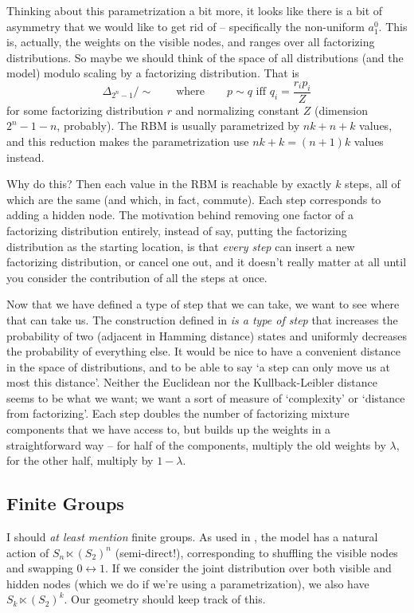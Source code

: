 \documentclass[12pt]{article}
\begin{document}
Thinking about this parametrization a bit more, it looks like there is a bit of
asymmetry that we would like to get rid of -- specifically the non-uniform
$a_1^0$.  This is, actually, the weights on the visible nodes, and ranges over
all factorizing distributions.  So maybe we should think of the space of
all distributions (and the model) modulo scaling by a factorizing distribution.
That is
\[
    \Delta_{2^n - 1} / \sim
    \qquad\text{where}\qquad
    p \sim q \text{ iff }
    q_i = \frac{r_i p_i}{Z}
\]
for some factorizing distribution $r$ and normalizing constant $Z$ (dimension
$2^n - 1 - n$, probably).  The RBM is usually parametrized by $nk + n + k$
values, and this reduction makes the parametrization use $nk +k = (n+1)k$ values
instead.

Why do this?  Then each value in the RBM is reachable by exactly $k$ steps, all
of which are the same (and which, in fact, commute).  Each step corresponds to
adding a hidden node.  The motivation behind removing one factor of a factorizing
distribution entirely, instead of say, putting the factorizing distribution as
the starting location, is that \textit{every step} can insert a new factorizing
distribution, or cancel one out, and it doesn't really matter at all until you
consider the contribution of all the steps at once.

Now that we have defined a type of step that we can take, we want to see where
that can take us.  The construction defined in \cite{MA10} \textit{is a type of
step} that increases the probability of two (adjacent in Hamming distance)
states and uniformly decreases the probability of everything else.  It would be
nice to have a convenient distance in the space of distributions, and to be able
to say `a step can only move us at most this distance'.  Neither the Euclidean
nor the Kullback-Leibler distance seems to be what we want; we want a sort of
measure of `complexity' or `distance from factorizing'.  Each step doubles the
number of factorizing mixture components that we have access to, but builds up
the weights in a straightforward way -- for half of the components, multiply the
old weights by $\lambda$, for the other half, multiply by $1 - \lambda$.

\subsection{Finite Groups}

I should \textit{at least mention} finite groups.  As used in \cite{CTY10}, the
model has a natural action of $S_n \ltimes (S_2)^n$ (semi-direct!),
corresponding to shuffling the visible nodes and swapping $0 \leftrightarrow 1$.
If we consider the joint distribution over both visible and hidden nodes (which
we do if we're using a parametrization), we also have $S_k \ltimes (S_2)^k$.
Our geometry should keep track of this.
\end{document}
